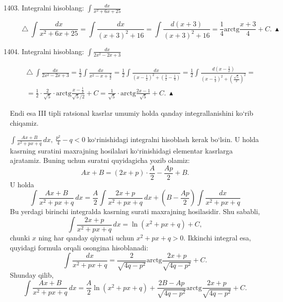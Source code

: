 \begin{enumerate}\setcounter{enumi}{1402}
	\item Integralni hisoblang: $\int\frac{dx}{x^2+6x+25}$
	
	$$\triangle\ \int\frac{dx}{x^2+6x+25}=\int\frac{dx}{(x+3)^2+16}=\int\frac{d(x+3)}{(x+3)^2+16}=\frac{1}{4}\mbox{arctg}\frac{x+3}{4}+C.\ \blacktriangle
	$$
	
	\item Integralni hisoblang: $\int\frac{dx}{2x^2-2x+3}$
	
	\begin{multline*}\triangle\ \int\frac{dx}{2x^2-2x+3}=\frac{1}{2}\int\frac{dx}{x^2-x+\frac{3}{2}}=\frac{1}{2}\int\frac{dx}{\left(x-\frac{1}{2}\right)^2+\left(\frac{3}{2}-\frac{1}{4}\right)} = \frac{1}{2}\int\frac{d\left(x-\frac{1}{2}\right)}{\left(x-\frac{1}{2}\right)^2+\left(\frac{\sqrt{5}}{2}\right)^2} =\\
		= \frac{1}{2}\cdot\frac{2}{\sqrt{5}}\cdot\mbox{arctg}\frac{x-\frac{1}{2}}{\sqrt{5}/2}+C=\frac{1}{\sqrt{5}}\cdot\mbox{arctg}\frac{2x-1}{\sqrt{5}}+C.\ \blacktriangle
\end{multline*}
\end{enumerate}
Endi esa III tipli ratsional kasrlar umumiy holda qanday integrallanishini ko`rib chiqamiz.

$\int\frac{Ax+B}{x^2+px+q}\,dx,\ \frac{p^2}{4}-q<0$ ko`rinishidagi integralni hisoblash kerak bo`lsin. U holda kasrning suratini maxrajning hosilalari ko`rinishidagi elementar kasrlarga ajratamiz. Buning uchun suratni quyidagicha yozib olamiz:
$$Ax+B=(2x+p)\cdot\frac{A}{2}-\frac{Ap}{2}+B.$$U holda
$$\int\frac{Ax+B}{x^2+px+q}\,dx=\frac{A}{2}\int\frac{2x+p}{x^2+px+q}\,dx+\left(B-\frac{Ap}{2}\right)\int\frac{dx}{x^2+px+q}$$
Bu yerdagi birinchi integralda kasrning surati maxrajning hosilasidir. Shu sababli, 
$$\int\frac{2x+p}{x^2+px+q}\,dx=\ln(x^2+px+q)+C,$$
chunki $x$ ning har qanday qiymati uchun $x^2+px+q>0$. Ikkinchi integral esa, quyidagi formula orqali osongina hisoblanadi:
$$\int\frac{dx}{x^2+px+q}=\frac{2}{\sqrt{4q-p^2}}\mbox{arctg}\frac{2x+p}{\sqrt{4q-p^2}}+C.$$
Shunday qilib, 
$$\int\frac{Ax+B}{x^2+px+q}\,dx=\frac{A}{2}\ln(x^2+px+q)+\frac{2B-Ap}{\sqrt{4q-p^2}}\mbox{arctg}\frac{2x+p}{\sqrt{4q-p^2}}+C.$$

